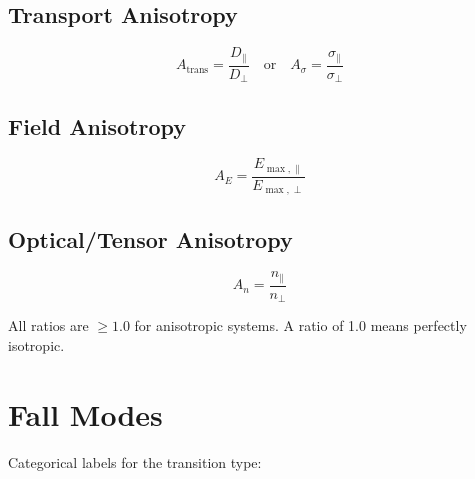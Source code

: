 \documentclass[11pt]{article}
\begin{document}
\subsection{Transport Anisotropy}

\begin{equation}
A_{\text{trans}} = \frac{D_{\parallel}}{D_{\perp}} \quad \text{or} \quad A_{\sigma} = \frac{\sigma_{\parallel}}{\sigma_{\perp}}
\end{equation}

\subsection{Field Anisotropy}

\begin{equation}
A_{E} = \frac{E_{\max, \parallel}}{E_{\max, \perp}}
\end{equation}

\subsection{Optical/Tensor Anisotropy}

\begin{equation}
A_{n} = \frac{n_{\parallel}}{n_{\perp}}
\end{equation}

All ratios are $\geq 1.0$ for anisotropic systems. A ratio of 1.0 means perfectly isotropic.

\section{Fall Modes}

Categorical labels for the transition type:
\end{document}
